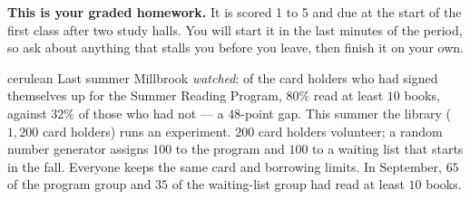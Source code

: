 \documentclass[12pt]{article}
\begin{document}

\vspace{0.12in}

\begin{remindbox}
\small
\textbf{This is your graded homework.} It is scored 1 to 5 and due at the start of the
first class after two study halls. You will start it in the last minutes of the period, so ask about anything that stalls
you before you leave, then finish it on your own.
\end{remindbox}

\vspace{0.08in}

\boxguard[20]
\begin{scenariobox}{cerulean}
Last summer Millbrook \emph{watched}: of the card holders who had signed themselves up for
the Summer Reading Program, $80\%$ read at least $10$ books, against $32\%$ of those who had
not --- a $48$-point gap. This summer the library ($1{,}200$ card holders) runs an experiment.
$200$ card holders volunteer; a random number generator assigns $100$ to the program and
$100$ to a waiting list that starts in the fall. Everyone keeps the same card and borrowing
limits. In September, $65$ of the program group and $35$ of the waiting-list group had read at
least $10$ books.
\end{scenariobox}

\vspace{0.08in}
\end{document}
